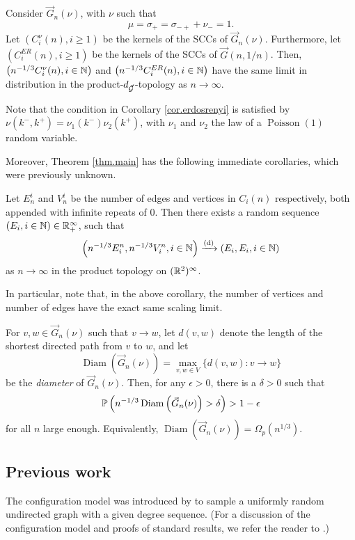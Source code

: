 \begin{theorem}\label{cor.erdosrenyi}
Consider $\vec{G}_n(\nu)$, with $\nu$ such that $$\mu=\sigma_+=\sigma_{-+}+\nu_-=1.$$ 
Let $(C^\nu_i(n), i\geq 1)$ be the kernels of the SCCs of $\vec{G}_n(\nu)$. Furthermore, let $(C^{ER}_i(n), i\geq 1)$ be the kernels of the SCCs of $\vec{G}(n,1/n)$. Then, $\left(n^{-1/3}C^\nu_i(n),i\in \N\right)$ and 
$\left(n^{-1/3}C^{ER}_i(n),i\in \N\right)$ have the same limit in distribution in the product-$d_{\vec{\cG}}$-topology as $n\to \infty$. 
\end{theorem}
Note that the condition in Corollary \ref{cor.erdosrenyi} is satisfied by $\nu(k^-,k^+)=\nu_1(k^-)\nu_2(k^+)$, with $\nu_1$ and $\nu_2$ the law of a $\operatorname{Poisson}(1)$ random variable.

Moreover, Theorem \ref{thm.main} has the following immediate corollaries, which were previously unknown. 
\begin{corollary}\label{cor.componentsizes}
Let $E^i_n$ and $V^i_n$ be the number of edges and vertices in $C_i(n)$ respectively, both appended with infinite repeats of $0$. Then there exists a random sequence $(E_i,i\in \N)\in \R_+^\infty$, such that
$$\left(n^{-1/3}E^n_i,n^{-1/3}V^n_i, i\in \N\right)\todist\left(E_i,E_i,i\in \N\right)$$
as $n\to \infty$ in the product topology on $(\R^2)^\infty$. 
\end{corollary}
In particular, note that, in the above corollary, the number of vertices and number of edges have the exact same scaling limit.
\begin{corollary}\label{cor.diameter}
For $v,w\in \vec{G}_n(\nu)$ such that $v\to w$, let $d(v,w)$ denote the length of the shortest directed path from $v$ to $w$, and let $$\operatorname{Diam}\left(\vec{G}_n(\nu)\right)=\max_{v,w\in V}\{d(v,w):v\to w\}$$ be the \emph{diameter} of $\vec{G}_n(\nu)$. Then, for any $\epsilon>0$, there is a $\delta>0$ such that $$\P\left( n^{-1/3}\operatorname{Diam}\left(\vec{G}_n(\nu)\right)>\delta\right)>1-\epsilon$$ for all $n$ large enough. Equivalently, $\operatorname{Diam}\left( \vec{G}_n(\nu) \right) = \Omega_p(n^{1/3})$.
\end{corollary}


\subsection{Previous work}\label{sec.previouswork}
The configuration model was introduced by \citet{bollobasProbabilisticProofAsymptotic1980} to sample a uniformly random undirected graph with a given degree sequence. (For a discussion of the configuration model and proofs of standard results, we refer the reader to \cite[Chapter 7]{hofstadRandomGraphsComplex2017}.)

